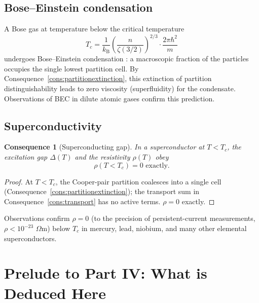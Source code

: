 \documentclass[11pt,twocolumn,a4paper]{article}
\theoremstyle{axiomstyle}
\theoremstyle{conseqstyle}
\newtheorem{consequence}{Consequence}
\theoremstyle{definition}
\theoremstyle{remark}
\newcommand{\kB}{k_{\mathrm{B}}}
\begin{document}
\subsection{Bose--Einstein condensation}

A Bose gas at temperature below the critical temperature
\begin{equation*}
T_{c}=\frac{1}{\kB}\left(\frac{n}{\zeta(3/2)}\right)^{2/3}\cdot\frac{2\pi\hbar^{2}}{m}
\end{equation*}
undergoes Bose--Einstein condensation \citep{bose1924,andersonetal1995}: a macroscopic fraction of the particles occupies the single lowest partition cell. By Consequence~\ref{cons:partitionextinction}, this extinction of partition distinguishability leads to zero viscosity (superfluidity) for the condensate. Observations of BEC in dilute atomic gases \citep{andersonetal1995} confirm this prediction.

\subsection{Superconductivity}

\begin{consequence}[Superconducting gap]
\label{cons:scgap}
In a superconductor at $T<T_{c}$, the excitation gap $\Delta(T)$ and the resistivity $\rho(T)$ obey
\begin{equation*}
\rho(T<T_{c})=0 \text{ exactly.}
\end{equation*}
\end{consequence}

\begin{proof}
At $T<T_{c}$, the Cooper-pair partition coalesces into a single cell (Consequence~\ref{cons:partitionextinction}); the transport sum in Consequence~\ref{cons:transport} has no active terms. $\rho=0$ exactly.
\end{proof}

Observations \citep{onnes1911} confirm $\rho=0$ (to the precision of persistent-current measurements, $\rho<10^{-23}$ $\Omega$m) below $T_{c}$ in mercury, lead, niobium, and many other elemental superconductors.

\section*{Prelude to Part IV: What is Deduced Here}
\end{document}
